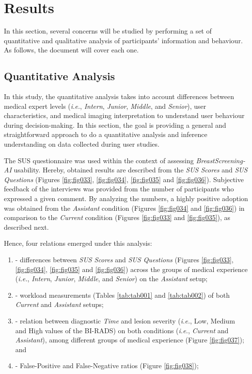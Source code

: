 \section{Results}
\label{sec:chap005006}

In this section, several concerns will be studied by performing a set of quantitative and qualitative analysis of participants' information and behaviour.
As follows, the document will cover each one.

\subsection{Quantitative Analysis}
\label{sec:chap005006001}

In this study, the quantitative analysis takes into account differences between medical expert levels ({\it i.e.}, {\it Intern}, {\it Junior}, {\it Middle}, and {\it Senior}), user characteristics, and medical imaging interpretation to understand user behaviour during decision-making.
In this section, the goal is providing a general and straightforward approach to do a quantitative analysis and inference understanding on data collected during user studies.

The \ac{SUS} questionnaire was used within the context of assessing {\it BreastScreening-AI} usability.
Hereby, obtained results are described from the {\it \ac{SUS} Scores} and {\it \ac{SUS} Questions} (Figures \ref{fig:fig033}, \ref{fig:fig034}, \ref{fig:fig035} and \ref{fig:fig036}).
Subjective feedback of the interviews was provided from the number of participants who expressed a given comment.
By analyzing the numbers, a highly positive adoption was obtained from the {\it Assistant} condition (Figures \ref{fig:fig034} and \ref{fig:fig036}) in comparison to the {\it Current} condition (Figures \ref{fig:fig033} and \ref{fig:fig035}), as described next.

\hfill

\noindent
Hence, four relations emerged under this analysis:

\begin{enumerate}[label=\alph*]
\item - differences between {\it \ac{SUS} Scores} and {\it \ac{SUS} Questions} (Figures \ref{fig:fig033}, \ref{fig:fig034}, \ref{fig:fig035} and \ref{fig:fig036}) across the groups of medical experience ({\it i.e.}, {\it Intern}, {\it Junior}, {\it Middle}, and {\it Senior}) on the {\it Assistant} setup;
\item - workload measurements (Tables \ref{tab:tab001} and \ref{tab:tab002}) of both {\it Current} and {\it Assistant} setups;
\item - relation between diagnostic {\it Time} and lesion severity ({\it i.e.}, Low, Medium and High values of the BI-RADS) on both conditions ({\it i.e.}, {\it Current} and {\it Assistant}), among different groups of medical experience (Figure \ref{fig:fig037}); and
\item - False-Positive and False-Negative ratios (Figure \ref{fig:fig038});
\end{enumerate}

